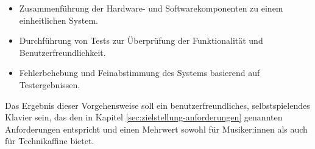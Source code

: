\begin{itemize}
    \item Zusammenführung der Hardware- und Softwarekomponenten zu einem einheitlichen System.
    \item Durchführung von Tests zur Überprüfung der Funktionalität und Benutzerfreundlichkeit.
    \item Fehlerbehebung und Feinabstimmung des Systems basierend auf Testergebnissen.
\end{itemize}

Das Ergebnis dieser Vorgehensweise soll ein benutzerfreundliches, selbstspielendes Klavier sein,
das den in Kapitel \ref{sec:zielstellung-anforderungen} genannten Anforderungen entspricht und einen Mehrwert sowohl für Musiker:innen als auch für Technikaffine bietet.
